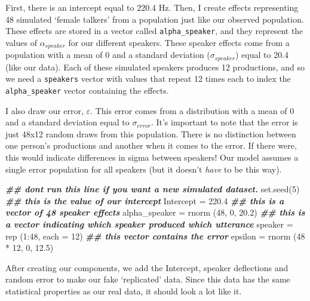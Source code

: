 \documentclass[
]{book}
\newenvironment{Shaded}{\begin{snugshade}}{\end{snugshade}}
\newcommand{\AttributeTok}[1]{\textcolor[rgb]{0.77,0.63,0.00}{#1}}
\newcommand{\DecValTok}[1]{\textcolor[rgb]{0.00,0.00,0.81}{#1}}
\newcommand{\DocumentationTok}[1]{\textcolor[rgb]{0.56,0.35,0.01}{\textbf{\textit{#1}}}}
\newcommand{\FloatTok}[1]{\textcolor[rgb]{0.00,0.00,0.81}{#1}}
\newcommand{\FunctionTok}[1]{\textcolor[rgb]{0.00,0.00,0.00}{#1}}
\newcommand{\NormalTok}[1]{#1}
\newcommand{\OtherTok}[1]{\textcolor[rgb]{0.56,0.35,0.01}{#1}}
\newcommand{\SpecialCharTok}[1]{\textcolor[rgb]{0.00,0.00,0.00}{#1}}
\begin{document}
First, there is an intercept equal to 220.4 Hz. Then, I create effects representing 48 simulated `female talkers' from a population just like our observed population. These effects are stored in a vector called \texttt{alpha\_speaker}, and they represent the values of \(\alpha_{speaker}\) for our different speakers. These speaker effects come from a population with a mean of 0 and a standard deviation (\(\sigma_{speaker}\)) equal to 20.4 (like our data). Each of these simulated speakers produces 12 productions, and so we need a \texttt{speakers} vector with values that repeat 12 times each to index the \texttt{alpha\_speaker} vector containing the effects.

I also draw our error, \(\varepsilon\). This error comes from a distribution with a mean of 0 and a standard deviation equal to \(\sigma_{error}\). It's important to note that the error is just 48x12 random draws from this population. There is no distinction between one person's productions and another when it comes to the error. If there were, this would indicate differences in sigma between speakers! Our model assumes a single error population for all speakers (but it doesn't \emph{have} to be this way).

\begin{Shaded}
\begin{Highlighting}[]
\DocumentationTok{\#\# don\textquotesingle{}t run this line if you want a new simulated dataset. }
\FunctionTok{set.seed}\NormalTok{(}\DecValTok{5}\NormalTok{)}
\DocumentationTok{\#\# this is the value of our intercept}
\NormalTok{Intercept }\OtherTok{=} \FloatTok{220.4}
\DocumentationTok{\#\# this is a vector of 48 speaker effects}
\NormalTok{alpha\_speaker }\OtherTok{=} \FunctionTok{rnorm}\NormalTok{ (}\DecValTok{48}\NormalTok{, }\DecValTok{0}\NormalTok{, }\FloatTok{20.2}\NormalTok{)}
\DocumentationTok{\#\# this is a vector indicating which speaker produced which utterance}
\NormalTok{speaker }\OtherTok{=} \FunctionTok{rep}\NormalTok{ (}\DecValTok{1}\SpecialCharTok{:}\DecValTok{48}\NormalTok{, }\AttributeTok{each =} \DecValTok{12}\NormalTok{)}
\DocumentationTok{\#\# this vector contains the error}
\NormalTok{epsilon }\OtherTok{=} \FunctionTok{rnorm}\NormalTok{ (}\DecValTok{48} \SpecialCharTok{*} \DecValTok{12}\NormalTok{, }\DecValTok{0}\NormalTok{, }\FloatTok{12.5}\NormalTok{)}
\end{Highlighting}
\end{Shaded}

After creating our components, we add the Intercept, speaker deflections and random error to make our fake `replicated' data. Since this data has the same statistical properties as our real data, it should look a lot like it.
\end{document}
